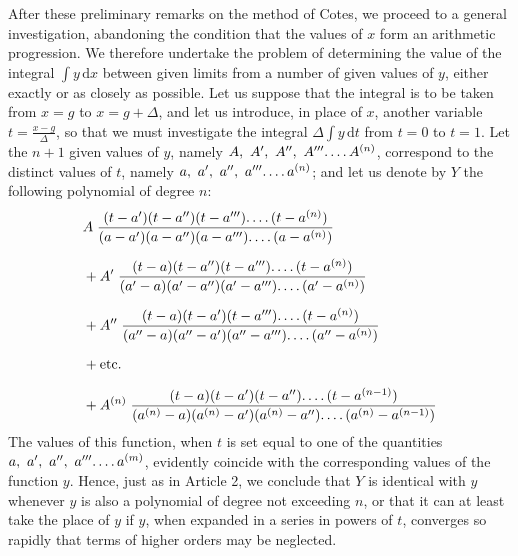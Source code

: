 After these preliminary remarks on the method of Cotes, we proceed to a general investigation, abandoning the condition that the values of $x$ form an arithmetic progression. We therefore undertake the problem of determining the value of the integral $\int y\,\mathrm{d}x$ between given limits from a number of given values of $y$, either exactly or as closely as possible. Let us suppose that the integral is to be taken from $x=g$ to $x=g+\Delta$, and let us introduce, in place of $x$, another variable $t=\frac{x-g}{\Delta}$, so that we must investigate the integral $\Delta\int y\,\mathrm{d}t$ from $t=0$ to $t=1$. Let the $n+1$ given values of $y$, namely $A,\ A',\ A'',\ A'''\ldotp\ldotp\ldotp\ldotp A^{(n)}$, correspond to the distinct values of $t$, namely $a,\ a',\ a'',\ a'''\ldotp\ldotp\ldotp\ldotp a^{(n)}$; and let us denote by $Y$ the following polynomial of degree $n$:
\[
\begin{aligned}
& A\;\frac{(t-a')(t-a'')(t-a''')\ldotp\ldotp\ldotp\ldotp(t-a^{(n)})}
{(a-a')(a-a'')(a-a''')\ldotp\ldotp\ldotp\ldotp(a-a^{(n)})}\\[6pt]
&{}+A'\;\frac{(t-a)(t-a'')(t-a''')\ldotp\ldotp\ldotp\ldotp(t-a^{(n)})}
{(a'-a)(a'-a'')(a'-a''')\ldotp\ldotp\ldotp\ldotp(a'-a^{(n)})}\\[6pt]
&{}+A''\;\frac{(t-a)(t-a')(t-a''')\ldotp\ldotp\ldotp\ldotp(t-a^{(n)})}
{(a''-a)(a''-a')(a''-a''')\ldotp\ldotp\ldotp\ldotp(a''-a^{(n)})}\\[6pt]
&{}+\text{etc.}\\[6pt]
&{}+A^{(n)}\;\frac{(t-a)(t-a')(t-a'')\ldotp\ldotp\ldotp\ldotp(t-a^{(n-1)})}
{(a^{(n)}-a)(a^{(n)}-a')(a^{(n)}-a'')\ldotp\ldotp\ldotp\ldotp(a^{(n)}-a^{(n-1)})}
\end{aligned}
\]
The values of this function, when $t$ is set equal to one of the quantities $a,\allowbreak \ a',\allowbreak \ a'',\allowbreak \ a'''\ldotp\ldotp\ldotp\ldotp a^{(m)}$, evidently coincide with the corresponding values of the function $y$. Hence, just as in Article 2, we conclude that $Y$ is identical with $y$ whenever $y$ is also a polynomial of degree not exceeding $n$, or that it can at least take the place of $y$ if $y$, when expanded in a series in powers of $t$, converges so rapidly that terms of higher orders may be neglected.


